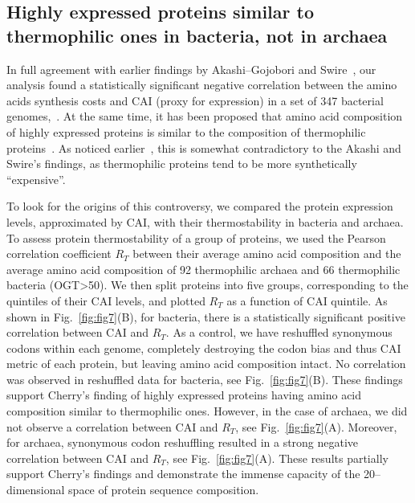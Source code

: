 \documentclass[10pt,letterpaper]{article}
\begin{document}
\subsection*{Highly expressed proteins similar to thermophilic ones in bacteria, not in archaea}

In full agreement with earlier findings by Akashi--Gojobori and Swire~\cite{Akashi2002Metabolic,Swire2007Selection}, our analysis found a statistically significant negative correlation between the amino acids synthesis costs and CAI (proxy for expression) in a set of 347 bacterial genomes,~. At the same time, it has been proposed that amino acid composition of highly expressed proteins is similar to the composition of thermophilic proteins~\cite{Cherry2010Highly}. As noticed earlier~\cite{Serohijos2012Protein}, this is somewhat contradictory to the Akashi and Swire's findings, as thermophilic proteins tend to be more synthetically ``expensive''.

To look for the origins of this controversy, we compared the protein expression levels, approximated by CAI, with their thermostability in bacteria and archaea. To assess protein thermostability of a group of proteins, we used the Pearson correlation coefficient $R_T$ between their average amino acid composition and the average amino acid composition of 92 thermophilic archaea and 66 thermophilic bacteria (OGT\textgreater50\textcelsius).  We then split proteins into five groups, corresponding to the quintiles of their CAI levels, and plotted $R_T$ as a function of CAI quintile. As shown in Fig.~\ref{fig:fig7}(B), for bacteria, there is a statistically significant positive correlation between CAI and $R_T$. As a control, we have reshuffled synonymous codons within each genome, completely destroying the codon bias and thus CAI metric of each protein, but leaving amino acid composition intact. No correlation was observed in reshuffled data for bacteria, see Fig.~\ref{fig:fig7}(B). These findings support Cherry's finding of highly expressed proteins having amino acid composition similar to thermophilic ones. However, in the case of archaea, we did not observe a correlation between CAI and $R_T$, see Fig.~\ref{fig:fig7}(A). Moreover, for archaea, synonymous codon reshuffling resulted in a strong negative correlation between CAI and $R_T$, see Fig.~\ref{fig:fig7}(A). These results partially support Cherry's findings and demonstrate the immense capacity of the 20--dimensional space of protein sequence composition. 
\end{document}
